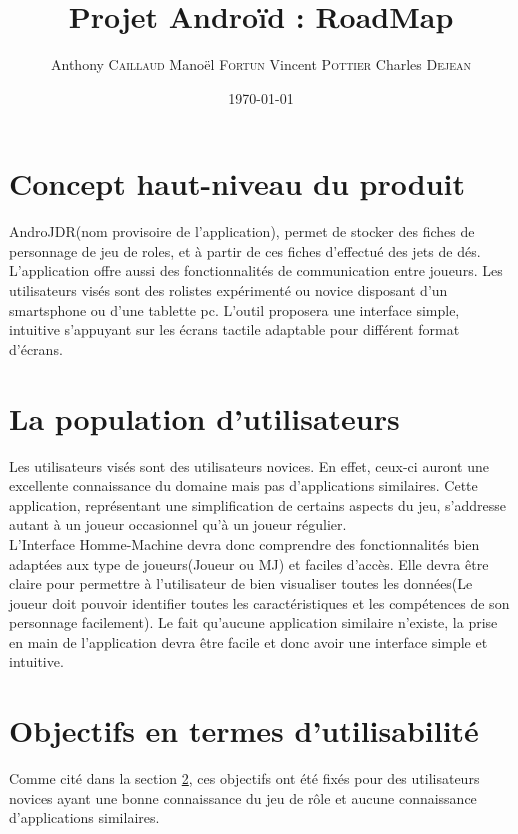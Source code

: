 ﻿\documentclass[11pt,a4paper]{article}
\title{Projet Androïd : RoadMap}
\author{Anthony \textsc{Caillaud} Manoël \textsc{Fortun} Vincent
\textsc{Pottier} Charles \textsc{Dejean}}
\date{\today}
\begin{document}
\maketitle

\clearpage
\tableofcontents
\clearpage
\section{Concept haut-niveau du produit}

AndroJDR(nom provisoire de l'application), permet de stocker des fiches de personnage de jeu de roles, et à partir de ces fiches d'effectué des jets de dés. L'application offre aussi des fonctionnalités de communication entre joueurs. Les utilisateurs visés sont des rolistes expérimenté ou novice disposant d'un smartsphone ou d'une tablette pc. L'outil proposera une interface simple, intuitive s'appuyant sur les écrans tactile adaptable pour différent format d'écrans.

\section{La population d'utilisateurs}
\label{utilisateurs}

Les utilisateurs visés sont des utilisateurs novices. En effet, ceux-ci auront
une excellente connaissance du domaine mais pas d'applications similaires.
Cette application, représentant une simplification de certains aspects du jeu,
s'addresse autant à un joueur occasionnel qu'à un joueur régulier.\\

L'Interface Homme-Machine devra donc comprendre des fonctionnalités bien
adaptées aux type de joueurs(Joueur ou MJ) et faciles d'accès. Elle devra être
claire pour permettre à l'utilisateur de bien visualiser toutes les données(Le
joueur doit pouvoir identifier toutes les caractéristiques et les compétences de
son personnage facilement). Le fait qu'aucune application similaire n'existe,
la prise en main de l'application devra être facile et donc avoir une interface
simple et intuitive.


\section{Objectifs en termes d'utilisabilité}

Comme cité dans la section \ref{utilisateurs}, ces objectifs ont été fixés pour
des utilisateurs novices ayant une bonne connaissance du jeu de rôle et aucune
connaissance d'applications similaires.\\
\end{document}
